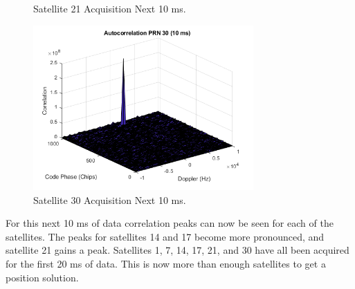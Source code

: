 \documentclass[11pt]{article}
\begin{document}
\begin{enumerate}[label=\textbf{\arabic*.}]
\begin{figure}[H]
        \caption{Satellite 21 Acquisition Next 10 ms.}
    \end{figure}
    \begin{figure}[H]
        \centering
        \includegraphics[width=0.75\textwidth]{Lab_4_PRN30_10ms.png}
        \caption{Satellite 30 Acquisition Next 10 ms.}
    \end{figure}
For this next 10 ms of data correlation peaks can now be seen for each of the satellites. The peaks for satellites 14 and 17 become more pronounced, and satellite 21 gains a peak. Satellites 1, 7, 14, 17, 21, and 30 have all been acquired for the first 20 ms of data. This is now more than enough satellites to get a position solution.
\end{enumerate}

    
\end{document}
